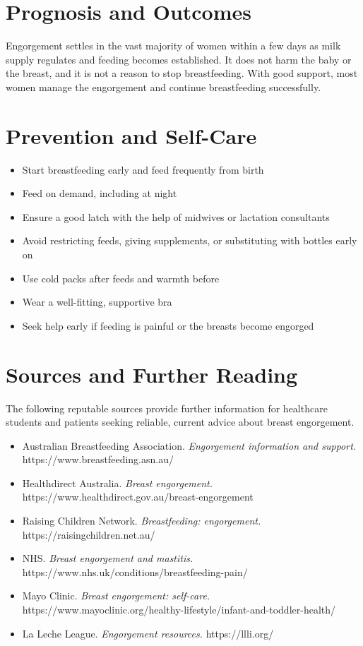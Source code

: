 \section*{Prognosis and Outcomes}
Engorgement settles in the vast majority of women within a few days as milk supply regulates and feeding becomes established. It does not harm the baby or the breast, and it is not a reason to stop breastfeeding. With good support, most women manage the engorgement and continue breastfeeding successfully.

\section*{Prevention and Self-Care}
\begin{itemize}
    \item Start breastfeeding early and feed frequently from birth
    \item Feed on demand, including at night
    \item Ensure a good latch with the help of midwives or lactation consultants
    \item Avoid restricting feeds, giving supplements, or substituting with bottles early on
    \item Use cold packs after feeds and warmth before
    \item Wear a well-fitting, supportive bra
    \item Seek help early if feeding is painful or the breasts become engorged
\end{itemize}

\section*{Sources and Further Reading}
The following reputable sources provide further information for healthcare students and patients seeking reliable, current advice about breast engorgement.
\begin{itemize}
    \item Australian Breastfeeding Association. \textit{Engorgement information and support.} https://www.breastfeeding.asn.au/
    \item Healthdirect Australia. \textit{Breast engorgement.} https://www.healthdirect.gov.au/breast-engorgement
    \item Raising Children Network. \textit{Breastfeeding: engorgement.} https://raisingchildren.net.au/
    \item NHS. \textit{Breast engorgement and mastitis.} https://www.nhs.uk/conditions/breastfeeding-pain/
    \item Mayo Clinic. \textit{Breast engorgement: self-care.} https://www.mayoclinic.org/healthy-lifestyle/infant-and-toddler-health/
    \item La Leche League. \textit{Engorgement resources.} https://llli.org/
\end{itemize}
